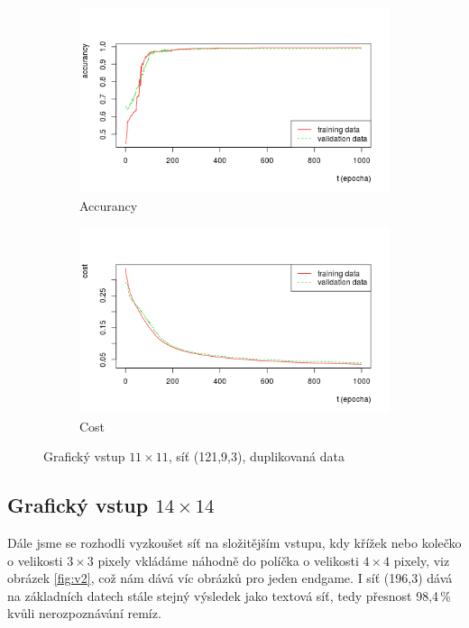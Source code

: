 \documentclass[10pt,a4paper]{article}
\begin{document}
\begin{figure}[h!]
\centering
\begin{subfigure}{.5\textwidth}
  \centering
  \includegraphics[width=\textwidth]{a3}
  \caption{Accurancy}
  \label{fig:a3}
\end{subfigure}%
\begin{subfigure}{.5\textwidth}
  \centering
  \includegraphics[width=\textwidth]{c3}
  \caption{Cost}
  \label{fig:c3}
\end{subfigure}
\caption{Grafický vstup $11\times 11$, síť (121,9,3), duplikovaná data}
\label{fig:3}
\end{figure}

\FloatBarrier
\subsection*{Grafický vstup $14\times 14$}
Dále jsme se rozhodli vyzkoušet síť na složitějším vstupu, kdy křížek nebo kolečko o velikosti $3\times 3$ pixely vkládáme náhodně do políčka o velikosti $4\times 4$ pixely, viz obrázek \ref{fig:v2}, což nám dává víc obrázků pro jeden endgame.
I síť (196,3) dává na základních datech stále stejný výsledek jako textová síť, tedy přesnost 98,4\,\% kvůli nerozpoznávání remíz. 
\end{document}
